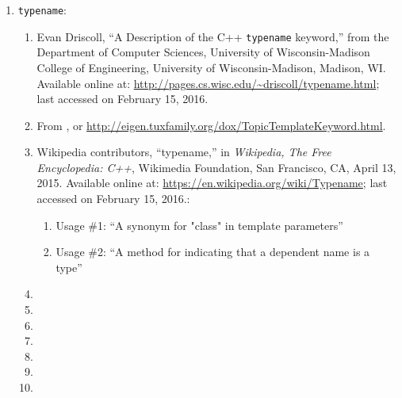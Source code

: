\begin{enumerate}
\begin{enumerate}
		\begin{enumerate} \itemsep -2pt
		\item 
		\end{enumerate}
	\item : \vspace{-0.2cm}
		\begin{enumerate} \itemsep -2pt
		\item 
		\end{enumerate}
	\item : \vspace{-0.2cm}
		\begin{enumerate} \itemsep -2pt
		\item 
		\end{enumerate}
	\end{enumerate}
\item {\tt typename}: \vspace{-0.3cm}
	\begin{enumerate} \itemsep -2pt
	\item Evan Driscoll, ``A Description of the C++ {\tt typename} keyword,'' from the Department of Computer Sciences, University of Wisconsin-Madison College of Engineering, University of Wisconsin-Madison, Madison, WI. Available online at: \url{http://pages.cs.wisc.edu/~driscoll/typename.html}; last accessed on February 15, 2016.
	\item From \cite[API documentation for Eigen3: The template and typename keywords in C++]{Avery2016}, or \url{http://eigen.tuxfamily.org/dox/TopicTemplateKeyword.html}.
	\item Wikipedia contributors, ``typename,'' in {\it Wikipedia, The Free Encyclopedia: C++}, Wikimedia Foundation, San Francisco, CA, April 13, 2015. Available online at: \url{https://en.wikipedia.org/wiki/Typename}; last accessed on February 15, 2016.: \vspace{-0.2cm}
		\begin{enumerate} \itemsep -2pt
		\item Usage \#1: ``A synonym for "class" in template parameters''
		\item Usage \#2: ``A method for indicating that a dependent name is a type''
		\end{enumerate}
	\item 
	\item 
	\item 
	\item 
	\item 
	\item 
	\item 

\end{enumerate}
\end{enumerate}
